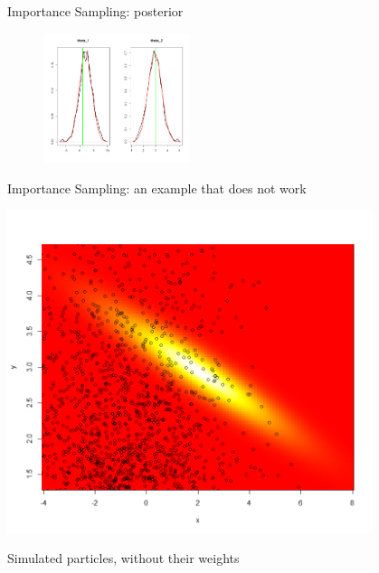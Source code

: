\begin{frame}{Importance Sampling: posterior}
\begin{figure}
\begin{minipage}[c]{.46\linewidth}
   \end{minipage}
   \includegraphics[width=\textwidth,height=3.8cm]{figures/post_IS_vraie.png}
\end{figure}
\end{frame}

\begin{frame}{Importance Sampling: an example that does not work}

\centering
\includegraphics[width=0.8\textwidth]{figures/IS_sampling_2.png}
 
Simulated particles, without their weights 
\end{frame}

